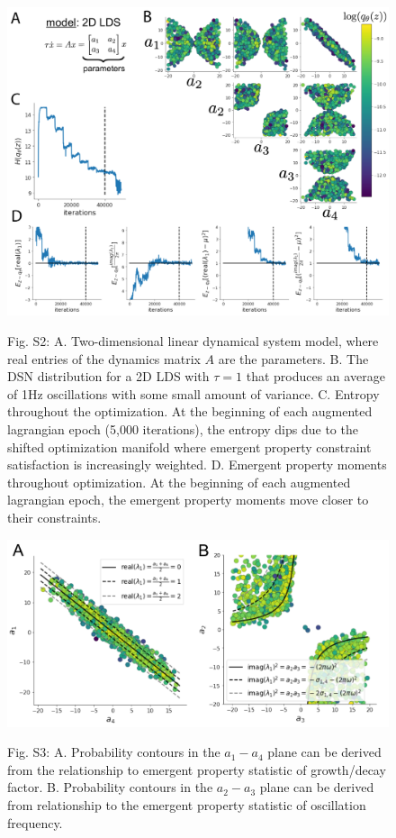 \documentclass[11pt]{article}
\begin{document}
\begin{figure}
\begin{center}
\includegraphics[scale=0.5]{figs/figS2/figS2.pdf}
\end{center}
Fig. S2: A. Two-dimensional linear dynamical system model, where real entries of the dynamics matrix $A$ are the parameters.  B. The DSN distribution for a 2D LDS with $\tau=1$ that produces an average of 1Hz oscillations with some small amount of variance.  C. Entropy throughout the optimization.  At the beginning of each augmented lagrangian epoch (5,000 iterations), the entropy dips due to the shifted optimization manifold where emergent property constraint satisfaction is increasingly weighted.  D. Emergent property moments throughout optimization.  At the beginning of each augmented lagrangian epoch, the emergent property moments move closer to their constraints.
\end{figure}

\begin{figure}
\begin{center}
\includegraphics[scale=0.5]{figs/figS5/figS5.pdf}
\end{center}
Fig. S3: A. Probability contours in the $a_1-a_4$ plane can be derived from the relationship to emergent property statistic of growth/decay factor. B. Probability contours in the $a_2-a_3$ plane can be derived from relationship to the emergent property statistic of oscillation frequency.
\end{figure}
\end{document}
